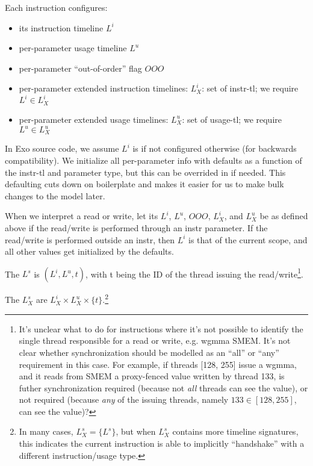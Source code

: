 Each instruction configures:
\begin{itemize}
  \item its instruction timeline $L^i$
  \filbreak
  \item per-parameter usage timeline $L^u$
  \filbreak
  \item per-parameter ``out-of-order'' flag $OOO$
  \filbreak
  \item per-parameter extended instruction timelines: $L_X^i$: set of instr-tl; we require $L^i \in L_X^i$
  \filbreak
  \item per-parameter extended usage timelines: $L_X^u$: set of usage-tl; we require $L^u \in L_X^u$
\end{itemize}
\filbreak
In Exo source code, we assume $L^i$ is  if not configured otherwise (for backwards compatibility).
We initialize all per-parameter info with defaults as a function of the instr-tl and parameter  type, but this can be overrided in  if needed.
This defaulting cuts down on boilerplate and makes it easier for us to make bulk changes to the model later.

\filbreak
{}

When we interpret a read or write, let its $L^i$, $L^u$, $OOO$, $L_X^i$, and $L_X^u$ be as defined above if the read/write is performed through an instr parameter.
If the read/write is performed outside an instr, then $L^i$ is that of the current scope, and all other values get initialized by the  defaults.

\filbreak
The  $L^s$ is $(L^i, L^u, t)$, with t being the ID of the thread issuing the read/write\footnote{It's unclear what to do for instructions where it's not possible to identify the single thread responsible for a read or write, e.g. wgmma SMEM.
It's not clear whether synchronization should be modelled as an ``all'' or ``any'' requirement in this case. For example, if threads [128, 255] issue a wgmma, and it reads from SMEM a proxy-fenced value written by thread 133, is futher synchronization required (because not \textit{all} threads can see the value), or not required (because \textit{any} of the issuing threads, namely $133 \in [128, 255]$, can see the value)?}.

\filbreak
The  $L_X^s$ are $L_X^i \times L_X^u \times \{ t \}$.\footnote{In many cases, $L_X^s = \{L^s\}$, but when $L_X^s$ contains more timeline signatures, this indicates the current instruction is able to implicitly ``handshake'' with a different instruction/usage type.}

